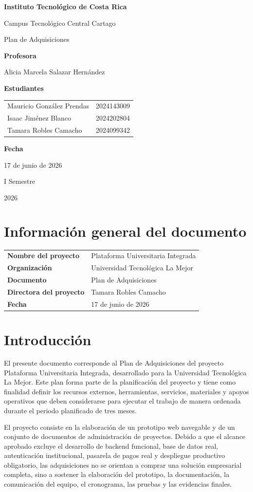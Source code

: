 \documentclass[11pt,spanish]{article}
\title{\DocumentoTitulo}
\author{\AutoresPortada}
\date{\FechaDocumento}
\makeatletter
\newcommand{\Institucion}{Instituto Tecnológico de Costa Rica}
\newcommand{\Campus}{Campus Tecnológico Central Cartago}
\newcommand{\DocumentoTitulo}{Plan de Adquisiciones}
\newcommand{\Profesor}{Alicia Marcela Salazar Hernández}
\newcommand{\FechaDocumento}{17 de junio de 2026}
\newcommand{\PeriodoAcademico}{I Semestre}
\newcommand{\AnioDocumento}{2026}
\newcommand{\AutoresPortada}{%
    \begin{tabular}{l@{\hspace{1.5cm}}r}
        Mauricio González Prendas & 2024143009 \\
        Isaac Jiménez Blanco & 2024202804 \\
        Tamara Robles Camacho & 2024099342 \\
    \end{tabular}%
}
\newcommand{\MakeCover}{%
\begin{titlepage}
\thispagestyle{empty}
\centering

{\bfseries \huge \Institucion \par}
\vspace{0.25cm}
{\LARGE \Campus \par}

\vfill

{\huge \DocumentoTitulo \par}

\vfill

{\bfseries \LARGE Profesora \par}
{\Large \Profesor \par}

\vfill

{\bfseries \LARGE Estudiantes \par}
{\Large \AutoresPortada \par}

\vfill

{\bfseries\LARGE Fecha \par}
{\Large \FechaDocumento \par}

\vfill

{\LARGE \PeriodoAcademico \par}
{\LARGE \AnioDocumento \par}

\end{titlepage}%
}
\makeatother
\begin{document}
\hypersetup{pageanchor=false}

\MakeCover

\pagestyle{empty}
\tableofcontents
\clearpage
{}
\hypersetup{pageanchor=true}
\pagestyle{fancy}


\section{Información general del documento}

\begin{table}[H]
\centering
\begin{tabularx}{\textwidth}{p{5cm} Y}
\toprule
\textbf{Nombre del proyecto} & Plataforma Universitaria Integrada \\
\textbf{Organización} & Universidad Tecnológica La Mejor \\
\textbf{Documento} & \DocumentoTitulo \\
\textbf{Directora del proyecto} & Tamara Robles Camacho \\
\textbf{Fecha} & \FechaDocumento \\
\bottomrule
\end{tabularx}
\end{table}

\section{Introducción}

El presente documento corresponde al Plan de Adquisiciones del proyecto Plataforma Universitaria Integrada, desarrollado para la Universidad Tecnológica La Mejor. Este plan forma parte de la planificación del proyecto y tiene como finalidad definir los recursos externos, herramientas, servicios, materiales y apoyos operativos que deben considerarse para ejecutar el trabajo de manera ordenada durante el periodo planificado de tres meses.

El proyecto consiste en la elaboración de un prototipo web navegable y de un conjunto de documentos de administración de proyectos. Debido a que el alcance aprobado excluye el desarrollo de backend funcional, base de datos real, autenticación institucional, pasarela de pagos real y despliegue productivo obligatorio, las adquisiciones no se orientan a comprar una solución empresarial completa, sino a sostener la elaboración del prototipo, la documentación, la comunicación del equipo, el cronograma, las pruebas y las evidencias finales.
\end{document}
